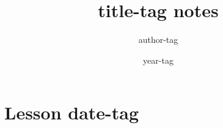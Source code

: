 \documentclass[a4paper,11pt]{article}
\title{title-tag notes}
\author{author-tag}
\date{year-tag}
\begin{document}
\section{Lesson date-tag}

\thispagestyle{empty}
\pagestyle{fancy}

\end{document}
